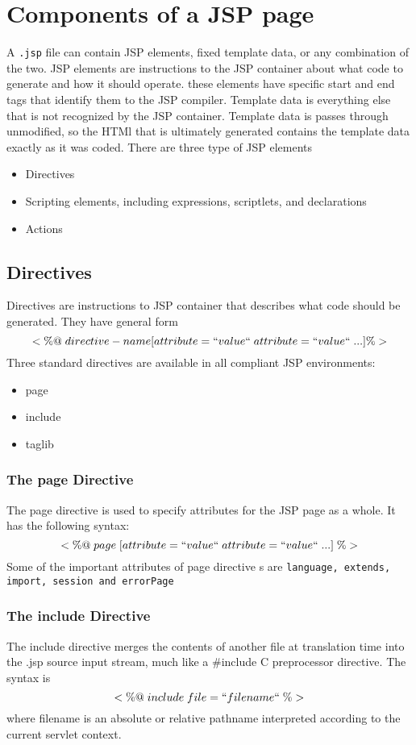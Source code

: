 \section{Components  of a JSP page}
A \texttt{.jsp} file can contain JSP elements, fixed template data, or any combination of the two. JSP elements are instructions to the JSP container about what code to generate and how it should operate. these elements have specific start and end tags that identify them to the JSP compiler. Template data is everything else that is not recognized by the JSP container. Template data is passes through unmodified, so the HTMl that is ultimately generated contains the template data exactly as it was coded. There are three type of JSP elements
\begin{itemize}
	\item Directives
	\item Scripting elements, including expressions, scriptlets, and declarations
	\item Actions
\end{itemize}

\subsection{Directives}
Directives are instructions to JSP container that describes what code should be generated. They have general form
$$<\%@\;directive-name[attribute=``value``\; attribute=``value``\; ...]\%>$$
Three standard directives are available in all compliant JSP environments:
\begin{itemize}
	\item page 
	\item include
	\item taglib
\end{itemize}


\subsubsection{The page Directive}
The page directive is used to specify attributes for the JSP page as a whole. It has the following syntax:
$$<\%@\;page\;[attribute=``value``\;attribute=``value``\;...]\;\%>$$
Some of the important attributes of page directive s are \texttt{language, extends, import, session and errorPage}


\subsubsection{The include Directive}
The include directive merges the contents of another file at translation time into the .jsp source input stream, much like a \#include C preprocessor directive. The syntax is
$$<\%@\;include\;file=``filename``\;\%>$$where filename is an absolute or relative pathname interpreted according to the current servlet context.


